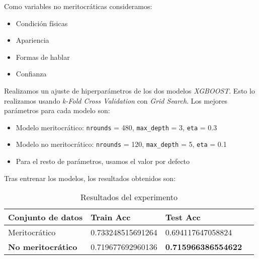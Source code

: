 Como variables no meritocráticas consideramos:
\begin{itemize}
    \item Condición físicas
    \item Apariencia
    \item Formas de hablar
    \item Confianza
\end{itemize}

Realizamos un ajuste de hiperparámetros de los dos modelos \textit{XGBOOST}. Esto lo realizamos usando \textit{k-Fold Cross Validation} con \textit{Grid Search}. Los mejores parámetros para cada modelo son:

\begin{itemize}
    \item Modelo meritocrático: \lstinline{nrounds} = 480, \lstinline{max_depth} = 3, \lstinline{eta} = 0.3
    \item Modelo no meritocrático: \lstinline{nrounds} = 120, \lstinline{max_depth} = 5, \lstinline{eta} = 0.1
    \item Para el resto de parámetros, usamos el valor por defecto
\end{itemize}

Tras entrenar los modelos, los resultados obtenidos son:

\begin{table}[H]
\centering
\begin{tabular}{|l|l|l|l}
\hline
Conjunto de datos    & Train Acc         & Test Acc              \\
\hline
Meritocrático        & 0.733248515691264 & 0.694117647058824     \\
    \textbf{No meritocrático} & 0.719677692960136 & \textbf{0.715966386554622} \\
\hline

\end{tabular}
\caption{Resultados del experimento}
\end{table}



